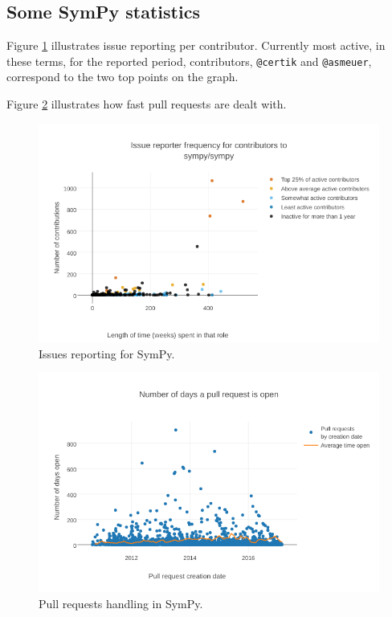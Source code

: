 \documentclass{deliverablereport}
\begin{document}
\subsection*{Some SymPy statistics}
Figure \ref{wp7:fig:sympyissues} illustrates issue reporting
per contributor.
Currently most active, in these terms,
for the reported period, contributors, {\tt @certik} and {\tt @asmeuer}, 
correspond to the two top points on the graph. 

Figure \ref{wp7:fig:sympypulls} illustrates how fast pull
requests are dealt with.

\begin{figure}[ht]
  \includegraphics[width=\textwidth]{sympy-issuereporting}
    \caption{Issues reporting for SymPy. 
    \label{wp7:fig:sympyissues}}
\end{figure}

\begin{figure}[ht]
  \includegraphics[width=\textwidth]{sympy-pullrequests}
    \caption{Pull requests handling in SymPy.\label{wp7:fig:sympypulls}}
\end{figure}

\clearpage

\printbibliography
\end{document}
